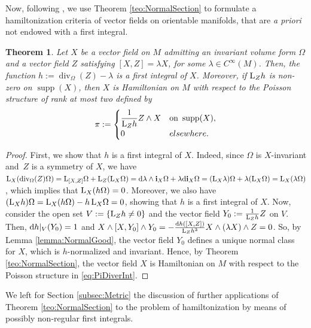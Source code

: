 \documentclass[10pt,a4paper]{amsart}
\newcommand{\dd}{{\rm d}}
\newcommand{\ii}{\mathbf{i}}
\numberwithin{equation}{section}
\newtheorem{Theorem}{Theorem}[section]
\begin{document}
Now, following \cite{LPS-12}, we use Theorem \ref{teo:NormalSection} to formulate a hamiltonization criteria of vector fields on orientable manifolds, that are \emph{a priori} not endowed with a first integral.

\begin{Theorem}\label{teo:DiverInt}
Let $X$ be a vector field on $M$ admitting an invariant volume form $\Omega$ and a vector field $Z$ satisfying $[X,Z]=\lambda X$, for some $\lambda \in C^{\infty}(M)$. Then, the function $h:=\operatorname{div}_{\Omega}(Z)-\lambda$ is a first integral of $X$. Moreover, if ${\rm L}_{Z}h$ is non-zero on $\operatorname{supp}(X)$, then $X$ is Hamiltonian on $M$ with respect to the Poisson structure of rank at most two defined by
 \begin{equation}\label{eq:PiDiverInt}
 \pi :=
 \begin{cases}
 \dfrac{1}{{\rm L}_{Z}h} Z \wedge X & \text{on} \  \operatorname{supp}(X),
 \\
 0 & elsewhere.
 \end{cases}
 \end{equation}
\end{Theorem}
\begin{proof}
First, we show that $h$ is a first integral of $X$. Indeed, since $\Omega$ is $X$-invariant and~$Z$ is a symmetry of $X$, we have ${\rm L}_{X}({\rm div}_{\Omega}(Z)\Omega) = {\rm L}_{[X,Z]}\Omega + {\rm L}_{Z}({\rm L}_{X}\Omega) = \dd \lambda\wedge\ii_{X}\Omega + \lambda\dd \ii_{X}\Omega = ({\rm L}_{X}\lambda)\Omega + \lambda({\rm L}_{X}\Omega) = {\rm L}_{X}(\lambda\Omega)$, which implies that ${\rm L}_{X}(h\Omega)=0$. Moreover, we also have $({\rm L}_{X}h)\Omega = {\rm L}_{X}(h\Omega) - h\,{\rm L}_{X}\Omega = 0$, showing that $h$ is a first integral of $X$.
Now, consider the open set $V := \{{\rm L}_{Z}h\neq 0\}$ and the vector field $Y_0:=\frac{1}{{\rm L}_{Z}h}Z$ on $V$. Then, $\dd h|_{V}(Y_0)=1$ and $X \wedge [X,Y_0] \wedge Y_0 = -\tfrac{\dd h([X,Z])}{{\rm L}_{Z}h^3}X \wedge(\lambda X)\wedge Z = 0$. So, by Lemma \ref{lemma:NormalGood}, the vector field $Y_0$ defines a unique normal class for $X$, which is $h$-normalized and invariant. Hence, by Theorem \ref{teo:NormalSection}, the vector field $X$ is Hamiltonian on $M$ with respect to the Poisson structure in \eqref{eq:PiDiverInt}.
\end{proof}

We left for Section \ref{subsec:Metric} the discussion of further applications of Theorem \ref{teo:NormalSection} to the problem of hamiltonization by means of possibly non-regular first integrals.
\end{document}
